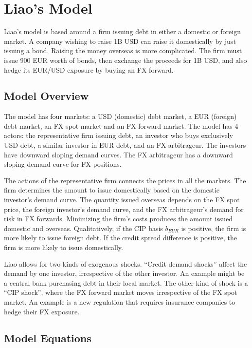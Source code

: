 \chapter{Liao's Model}  \label{model}

\renewcommand{\theequation}{A\thechapter.\arabic{equation}}

Liao's model is based around a firm issuing debt in either a domestic or foreign market.  A company wishing to raise 1B USD can raise it domestically by just issuing a bond.  Raising the money overseas is more complicated.  The firm must issue 900 EUR worth of bonds, then exchange the proceeds for 1B USD, and also hedge its EUR/USD exposure by buying an FX forward.


\section{Model Overview}

The model has four markets: a USD (domestic) debt market, a EUR (foreign) debt market, an FX spot market and an FX forward market.  The model has 4 actors: the representative firm issuing debt, an investor who buys exclusively USD debt, a similar investor in EUR debt, and an FX arbitrageur.  The investors have downward sloping demand curves.  The FX arbitrageur has a downward sloping demand curve for FX positions.

The actions of the representative firm connects the prices in all the markets.  The firm determines the amount to issue domestically based on the domestic investor's demand curve.  The quantity issued overseas depends on the FX spot price, the foreign investor's demand curve, and the FX arbitrageur's demand for risk in FX forwards.  Minimizing the firm's costs produces the amount issued domestic and overseas.  Qualitatively, if the CIP basis $b_{EUR}$ is positive, the firm is more likely to issue foreign debt.  If the credit spread difference is positive, the firm is more likely to issue domestically.  

Liao allows for two kinds of exogenous shocks.  ``Credit demand shocks'' affect the demand by one investor, irrespective of the other investor.  An example might be a central bank purchasing debt in their local market.  The other kind of shock is a ``CIP shock'', where the FX forward market moves irrespective of the FX spot market.  An example is a new regulation that requires insurance companies to hedge their FX exposure.

\section{Model Equations}

